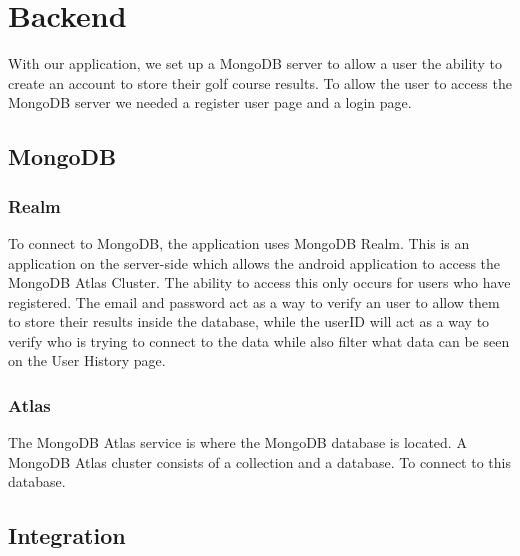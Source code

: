 \section{Backend}
With our application, we set up a MongoDB server to allow a user the ability to create an account to store their golf course results. To allow the user to access the MongoDB server we needed a register user page and a login page.
\subsection{MongoDB}
\subsubsection{Realm}
To connect to MongoDB, the application uses MongoDB Realm. This is an application on the server-side which allows the android application to access the MongoDB Atlas Cluster. The ability to access this only occurs for users who have registered. The email and password act as a way to verify an user to allow them to store their results inside the database, while the userID will act as a way to verify who is trying to connect to the data while also filter what data can be seen on the User History page.
\subsubsection{Atlas}
The MongoDB Atlas service is where the MongoDB database is located. A MongoDB Atlas cluster consists of a collection and a database. To connect to this database.
\subsection{Integration}
